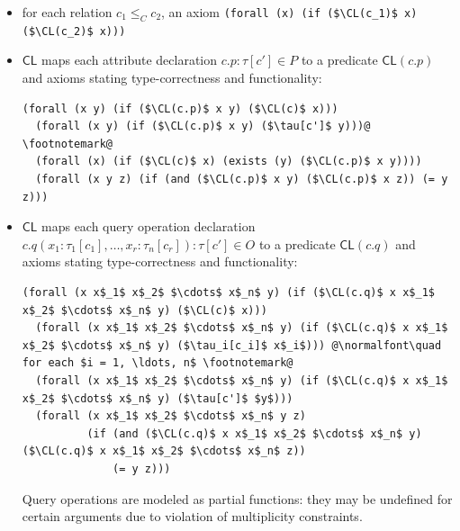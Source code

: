\documentclass[10pt, a4paper]{isov2}
\newcommand*{\CL}{\ensuremath{\mathsf{CL}}\xspace}
\begin{document}
\begin{itemize} [topsep=0pt, label=--, leftmargin=*]
\begin{itemize} [topsep=0pt, label=--, leftmargin=*]
  \item $\CL(\mathsf{Bag}[c]) = \CL(\mathsf{Bag}) = \texttt{form:Bag}$,

  \item $\CL(c) = c$, if $c$ a class name which is not one of the above.
 \end{itemize} 

  \item for each relation $c_1 \leq_C c_2$, an axiom %
\lstinline[language=clif, mathescape]!(forall (x) (if ($\CL(c_1)$ x) ($\CL(c_2)$ x)))!

  \item $\CL$
maps each attribute declaration $c.p : \tau[c'] \in P$
to a predicate $\CL(c.p)$
and axioms stating type-correctness and functionality:
%
\begin{lstlisting}[language=clif, mathescape, escapechar=@]
  (forall (x y) (if ($\CL(c.p)$ x y) ($\CL(c)$ x)))
  (forall (x y) (if ($\CL(c.p)$ x y) ($\tau[c']$ y)))@ \footnotemark@
  (forall (x) (if ($\CL(c)$ x) (exists (y) ($\CL(c.p)$ x y))))
  (forall (x y z) (if (and ($\CL(c.p)$ x y) ($\CL(c.p)$ x z)) (= y z)))
\end{lstlisting}%

  \item $\CL$
maps each query operation declaration
$c.q(x_1 : \tau_1[c_1], \dots, x_r : \tau_n[c_r]) : \tau[c'] \in O$
to a predicate $\CL(c.q)$
and axioms stating type-correctness and functionality:
%
\begin{lstlisting}[language=clif, mathescape, escapechar=@]
  (forall (x x$_1$ x$_2$ $\cdots$ x$_n$ y) (if ($\CL(c.q)$ x x$_1$ x$_2$ $\cdots$ x$_n$ y) ($\CL(c)$ x)))
  (forall (x x$_1$ x$_2$ $\cdots$ x$_n$ y) (if ($\CL(c.q)$ x x$_1$ x$_2$ $\cdots$ x$_n$ y) ($\tau_i[c_i]$ x$_i$))) @\normalfont\quad for each $i = 1, \ldots, n$ \footnotemark@
  (forall (x x$_1$ x$_2$ $\cdots$ x$_n$ y) (if ($\CL(c.q)$ x x$_1$ x$_2$ $\cdots$ x$_n$ y) ($\tau[c']$ $y$)))
  (forall (x x$_1$ x$_2$ $\cdots$ x$_n$ y z)
          (if (and ($\CL(c.q)$ x x$_1$ x$_2$ $\cdots$ x$_n$ y) ($\CL(c.q)$ x x$_1$ x$_2$ $\cdots$ x$_n$ z))
              (= y z)))
\end{lstlisting}%
%
Query operations are modeled as partial functions: they may be undefined
for certain arguments due to violation of multiplicity constraints.


\end{itemize}
\end{document}
